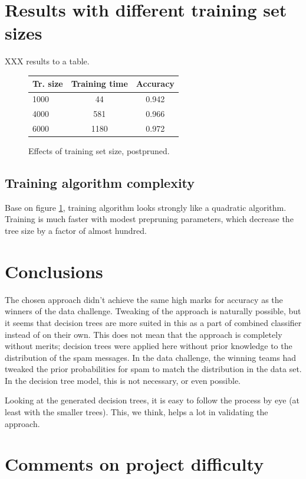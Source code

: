 \documentclass[a4paper,10pt]{article}
\begin{document}
\section{Results with different training set sizes}

XXX results to a table.
\begin{figure}
  \centering
\begin{tabular}{|l|c|c|}
\hline
Tr. size & Training time & Accuracy \\ \hline
1000 & 44 & 0.942 \\
4000 & 581 & 0.966 \\
6000 & 1180 & 0.972 \\
\hline
\end{tabular}
  \caption{Effects of training set size, postpruned.}
  \label{fig:training-data-size} 
\end{figure}

\subsection{Training algorithm complexity}

Base on figure \ref{fig:training-data-size}, training algorithm looks
strongly like a quadratic algorithm.  Training is much faster with
modest prepruning parameters, which decrease the tree size by a factor
of almost hundred.

\section{Conclusions}

The chosen approach didn't achieve the same high marks for accuracy as
the winners of the data challenge.  Tweaking of the approach is
naturally possible, but it seems that decision trees are more suited in
this as a part of combined classifier instead of on their own.  This
does not mean that the approach is completely without merits; decision
trees were applied here without prior knowledge to the distribution of
the spam messages.  In the data challenge, the winning teams had tweaked
the prior probabilities for spam to match the distribution in the data
set.  In the decision tree model, this is not necessary, or even
possible.

Looking at the generated decision trees, it is easy to follow the
process by eye (at least with the smaller trees).  This, we think, helps
a lot in validating the approach.

\section{Comments on project difficulty}
\end{document}
